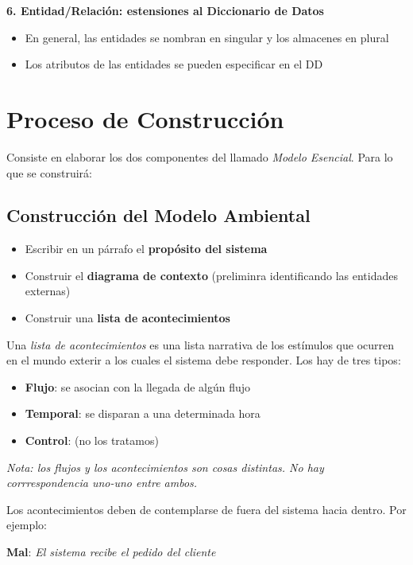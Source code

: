 \textbf{6. Entidad/Relación: estensiones al Diccionario de Datos}

\begin{itemize}[noitemsep]
\item En general, las entidades se nombran en singular y los almacenes en plural
\item Los atributos de las entidades se pueden especificar en el DD
\end{itemize}

\section{Proceso de Construcción}

Consiste en elaborar los dos componentes del llamado \textit{Modelo Esencial}. Para lo que se construirá:

\subsection{Construcción del Modelo Ambiental}

\begin{itemize}[noitemsep]
\item Escribir en un párrafo el \textbf{propósito del sistema}
\item Construir el \textbf{diagrama de contexto} (preliminra identificando las entidades externas)
\item Construir una \textbf{lista de acontecimientos}
\end{itemize}

Una \textit{lista de acontecimientos} es una lista narrativa de los estímulos que ocurren en el mundo exterir a los cuales el sistema debe responder. Los hay de tres tipos:

\begin{itemize}[noitemsep]
\item \textbf{Flujo}: se asocian con la llegada de algún flujo
\item \textbf{Temporal}: se disparan a una determinada hora
\item \textbf{Control}: (no los tratamos)
\end{itemize}

\textit{Nota: los flujos y los acontecimientos son cosas distintas. No hay corrrespondencia uno-uno entre ambos.}

Los acontecimientos deben de contemplarse de fuera del sistema hacia dentro. Por ejemplo:

\textbf{Mal}: \textit{El sistema recibe el pedido del cliente}

